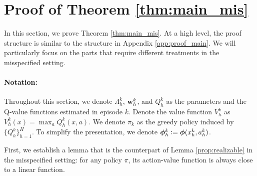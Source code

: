 



\section{Proof of Theorem \ref{thm:main_mis}} \label{app:proof_main_mis}
In this section, we prove Theorem \ref{thm:main_mis}. At a high level, the proof structure is similar to the structure in Appendix \ref{app:proof_main}. We will particularly focus on the parts that require different treatments in the misspecified setting.


\paragraph{Notation:} Throughout this section, we denote $\Lambda_h^k$, $\mathbf{w}^k_h$, and $Q_h^k$ as the parameters and the Q-value functions estimated in episode $k$. 
Denote the value function $V_h^k$ as $V_h^k(x) = \max_a Q_h^k(x, a)$. We denote $\pi_k$ as the greedy policy induced by $\{Q_h^k\}_{h=1}^H$.
To simplify the presentation, we denote $\bm{\phi}^k_h \mathrel{\mathop:}= \bm{\phi}(x^{k}_h, a^{k}_h)$.

First, we establish a lemma that is the counterpart of Lemma \ref{prop:realizable} in the misspecified setting: for any policy $\pi$, its action-value function is always close to a linear function.

